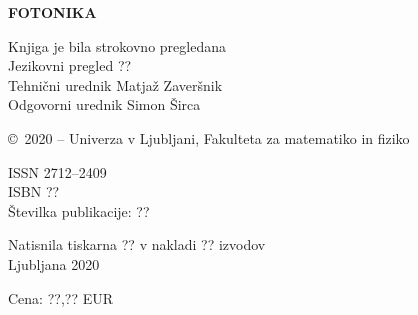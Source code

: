 \documentclass[a4paper,10pt]{book}
\begin{document}
\bigskip
\textbf{FOTONIKA}

\bigskip
\bigskip
Knjiga je bila strokovno pregledana \\
Jezikovni pregled ?? \\
Tehnični urednik Matjaž Zaveršnik \\
Odgovorni urednik Simon Širca

\bigskip
\copyright\ 2020 -- Univerza v Ljubljani, Fakulteta za matematiko in fiziko

\bigskip
ISSN 2712--2409 \\
ISBN ?? \\
Številka publikacije: ??

\bigskip
Natisnila tiskarna ?? v nakladi ?? izvodov \\
Ljubljana 2020

\bigskip
Cena: ??,?? {\small EUR}

\end{document}
